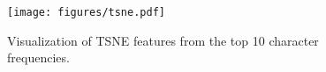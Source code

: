 
\begin{figure}[!t]
    \begin{center}
    \texttt{[image: figures/tsne.pdf]}
    \end{center}
    \caption{Visualization of TSNE features from the top 10 character frequencies.}
    \label{fig:tsne}
\end{figure}

    